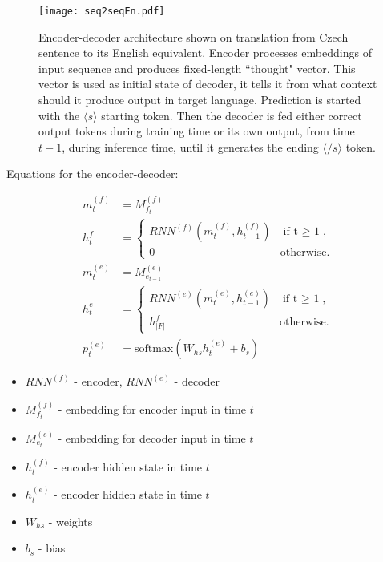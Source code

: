 \documentclass{ExcelAtFIT}
\begin{document}
\begin{figure*}[h!]\centering %
  \centering
  \texttt{[image: seq2seqEn.pdf]}\\[1pt]
  \caption{Encoder-decoder architecture shown on translation from Czech sentence to its English equivalent. Encoder processes embeddings of input sequence and produces fixed-length ``thought" vector. This vector is used as initial state of decoder, it tells it from what context should it produce output in target language. Prediction is started with the $\langle s \rangle$ starting token. Then the decoder is fed either correct output tokens during training time or its own output, from time $t - 1$, during inference time, until it generates the ending $\langle /s \rangle$ token.}
  \label{fig:seq2seq}
\end{figure*}

Equations for the encoder-decoder:
\begin{linenomath}
\begin{align}
    m^{(f)}_{t}&=M^{(f)}_{f_t}\label{figure:encoderEmb} \\
    h^{f}_{t}&=\begin{cases}
                    RNN^{(f)}(m^{(f)}_{t},h^{(f)}_{t-1}) & \mbox{if t $\geq$ 1},\label{figure:encoderState} \\
                    0 & \mbox{otherwise}.
                \end{cases}\\
    m^{(e)}_{t}&=M^{(e)}_{e_{t-1}}\label{figure:decoderEmb} \\
    h^{e}_{t}&=\begin{cases}
                    RNN^{(e)}(m^{(e)}_{t},h^{(e)}_{t-1}) & \mbox{if t $\geq$ 1},\\
                    h^{f}_{|F|} & \mbox{otherwise}.
                \end{cases}\label{figure:decoderState} \\
    p^{(e)}_{t}&=\mbox{softmax}(W_{hs}h^{(e)}_{t} + b_{s}) \label{figure:resultSoftmax}
\end{align}
\end{linenomath}

\begin{itemize}
    \item $RNN^(f)$ - encoder, $RNN^(e)$ - decoder
    \item $M^{(f)}_{f_t}$ - embedding for encoder input in time $t$
    \item $M^{(e)}_{e_t}$ - embedding for decoder input in time $t$
    \item $h^{(f)}_t$ - encoder hidden state in time $t$
    \item $h^{(e)}_t$ - encoder hidden state in time $t$
    \item $W_{hs}$ - weights
    \item $b_s$ - bias
\end{itemize}
\end{document}
